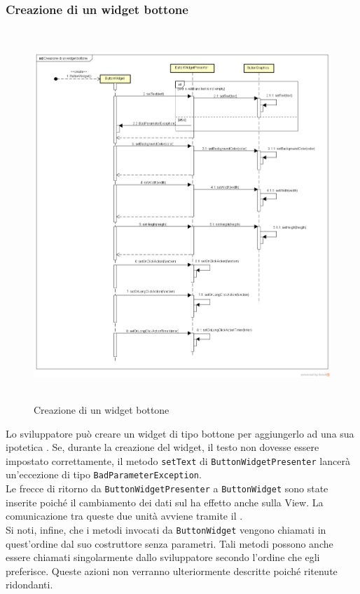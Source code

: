 \newpage

\subsubsection{Creazione di un widget bottone}

\label{Creazione di un widget bottone}
\begin{figure}[H]
	\centering
	\includegraphics[width=16cm, height=14cm]{Sezioni/Diagrammi/SDK/Creazione di un widget bottone.png}
	\caption{Creazione di un widget bottone}
\end{figure}

Lo sviluppatore può creare un widget di tipo bottone per aggiungerlo ad una sua ipotetica . Se, durante la creazione del widget, il testo non dovesse essere impostato correttamente, il metodo \texttt{setText} di \texttt{ButtonWidgetPresenter} lancerà un'eccezione di tipo \texttt{BadParameterException}. \\
Le frecce di ritorno da \texttt{ButtonWidgetPresenter}  a \texttt{ButtonWidget} sono state inserite poiché il cambiamento dei dati sul  ha effetto anche sulla View. La comunicazione tra queste due unità avviene tramite il  . \\
Si noti, infine, che i metodi invocati da \texttt{ButtonWidget} vengono chiamati in quest'ordine dal suo costruttore senza parametri. Tali metodi possono anche essere chiamati singolarmente dallo sviluppatore secondo l'ordine che egli preferisce. Queste azioni non verranno ulteriormente descritte poiché ritenute ridondanti.

